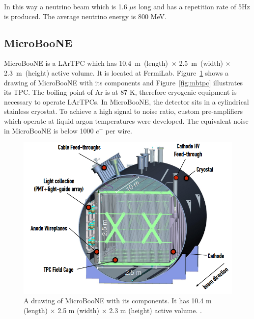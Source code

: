 \documentclass[a4paper]{article}\linespread{1.4}
\begin{document}
In this way a neutrino beam which is 1.6 $\mu$s long and has a repetition rate of 5Hz is produced. The average neutrino energy is 800 MeV.

\subsection{MicroBooNE}

MicroBooNE is a LArTPC which has 10.4~m~(length)~$\times$ 2.5~m~(width) $\times$ 2.3~m~(height) active volume. It is located at FermiLab. Figure~\ref{fig:mb} shows a drawing of MicroBooNE with its components and Figure~\ref{fig:mbtpc} illustrates its TPC.
The boiling point of Ar is at 87 K, therefore cryogenic equipment is necessary to operate LArTPCs. In MicroBooNE, the detector sits in a cylindrical stainless cryostat. To achieve a high signal to noise ratio, custom pre-amplifiers which operate at liquid argon temperatures were developed. The equivalent noise in MicroBooNE is below 1000 $e^{-}$ per wire. %
\begin{figure}[h!] \centering \includegraphics[width=120mm,scale=1.0]{figures/mb.png} \caption{A drawing of MicroBooNE with its components. It has 10.4 m (length) $\times$ 2.5 m (width) $\times$ 2.3 m (height) active volume. \cite{PP}.} \label{fig:mb}\end{figure}  
\end{document}
